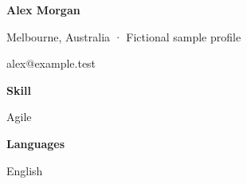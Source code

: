 \documentclass[10pt,a4paper]{article}
\begin{document}
{\LARGE\bfseries\color{navy} Alex Morgan}\par
Melbourne, Australia · Fictional sample profile\par
alex@example.test\par
{\large\bfseries\color{navy} Skill}\par
Agile\par
{\large\bfseries\color{navy} Languages}\par
English\par
\end{document}
